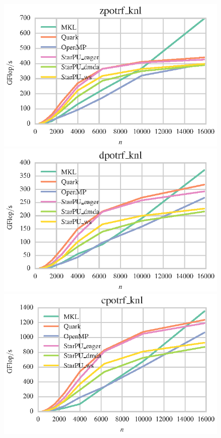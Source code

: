 \documentclass[a4paper,12pt]{article}
\begin{document}
\begin{figure}[t]
  \centering
  \includegraphics[scale=.85]{fig/knl_ram_zpotrf_weak_scaling.eps}
  \includegraphics[scale=.85]{fig/knl_ram_dpotrf_weak_scaling.eps}
  \includegraphics[scale=.85]{fig/knl_ram_cpotrf_weak_scaling.eps}

\end{figure}
\end{document}
